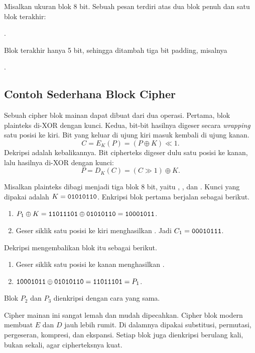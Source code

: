 Misalkan ukuran blok 8 bit. Sebuah pesan terdiri atas dua blok penuh dan satu
blok terakhir:
\begin{center}
.
\end{center}
Blok terakhir hanya 5 bit, sehingga ditambah tiga bit padding, misalnya
\begin{center}
.
\end{center}

\subsection{Contoh Sederhana Block Cipher}

Sebuah cipher blok mainan dapat dibuat dari dua operasi. Pertama, blok
plainteks di-XOR dengan kunci. Kedua, bit-bit hasilnya digeser secara
\textit{wrapping} satu posisi ke kiri. Bit yang keluar di ujung kiri masuk
kembali di ujung kanan.
\begin{equation}
C = E_K(P) = (P \oplus K) \ll 1.
\label{eq:mainan-enkripsi}
\end{equation}
Dekripsi adalah kebalikannya. Bit cipherteks digeser dulu satu posisi ke kanan,
lalu hasilnya di-XOR dengan kunci:
\begin{equation}
P = D_K(C) = (C \gg 1) \oplus K.
\label{eq:mainan-dekripsi}
\end{equation}

Misalkan plainteks dibagi menjadi tiga blok 8 bit, yaitu ,
, dan . Kunci yang dipakai adalah
$K = \texttt{01010110}$. Enkripsi blok pertama berjalan sebagai berikut.
\begin{enumerate}
    \item $P_1 \oplus K = \texttt{11011101} \oplus \texttt{01010110} =
          \texttt{10001011}$.
    \item Geser siklik  satu posisi ke kiri menghasilkan
          . Jadi $C_1 = \texttt{00010111}$.
\end{enumerate}
Dekripsi mengembalikan blok itu sebagai berikut.
\begin{enumerate}
    \item Geser siklik  satu posisi ke kanan menghasilkan
          .
    \item $\texttt{10001011} \oplus \texttt{01010110} = \texttt{11011101} = P_1$.
\end{enumerate}
Blok $P_2$ dan $P_3$ dienkripsi dengan cara yang sama.

Cipher mainan ini sangat lemah dan mudah dipecahkan. Cipher blok modern membuat
$E$ dan $D$ jauh lebih rumit. Di dalamnya dipakai substitusi, permutasi,
pergeseran, kompresi, dan ekspansi. Setiap blok juga dienkripsi berulang kali,
bukan sekali, agar cipherteksnya kuat.
